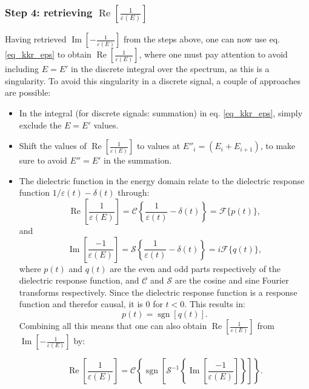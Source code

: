\subsubsection{Step 4: retrieving $\operatorname{Re}\left[\frac{1}{\varepsilon(E)}\right]$ }
Having retrieved $\operatorname{Im}\left[-\frac{1}{\varepsilon(E)}\right]$ from the steps above, one can now use eq. \eqref{eq_kkr_eps} to obtain $\operatorname{Re}\left[\frac{1}{\varepsilon(E)}\right]$, where one must pay attention to avoid including $E=E'$ in the discrete integral over the spectrum, as this is a singularity. To avoid this singularity in a discrete signal, a couple of approaches are possible:
\begin{itemize}
    \item In the integral (for discrete signals: summation) in eq. \eqref{eq_kkr_eps}, simply exclude the $E = E'$ values.
    \item Shift the values of $\operatorname{Re}\left[\frac{1}{\varepsilon(E)}\right]$ to values at $E''_i = (E_i + E_{i+1})$, to make sure to avoid $E'' = E'$ in the summation.
    \item  The dielectric function in the energy domain relate to the dielectric response function $1/\varepsilon(t) -\delta(t)$ through:
    \begin{equation}
        \operatorname{Re}\left[\frac{1}{\varepsilon(E)}\right] = \mathcal{C}\left\{\frac{1}{\varepsilon(t)} - \delta(t)\right\} = \mathcal{F}\{p(t)\},
    \end{equation}
    and 
    \begin{equation}
        \operatorname{Im}\left[\frac{-1}{\varepsilon(E)}\right] = \mathcal{S}\left\{\frac{1}{\varepsilon(t)} - \delta(t)\right\} = i\mathcal{F}\{q(t)\},
    \end{equation}
    where $p(t)$ and $q(t)$ are the even and odd parts respectively of the dielectric response function, and $\mathcal{C}$ and $\mathcal{S}$ are the cosine and sine Fourier transforms respectively. Since the dielectric response function is a response function and therefor causal, it is $0$ for $t<0$. This results in:
    \begin{equation}
        p(t) = \operatorname{sgn}[q(t)].
    \end{equation}
    Combining all this means that one can also obtain $\operatorname{Re}\left[\frac{1}{\varepsilon(E)}\right]$ from $\operatorname{Im}\left[-\frac{1}{\varepsilon(E)}\right]$ by:
    
    \begin{equation}
        \operatorname{Re}\left[\frac{1}{\varepsilon(E)}\right] =\mathcal{C}\left\{\operatorname{sgn}\left[\mathcal{S}^{-1}\left\{\operatorname{Im}\left[\frac{-1}{ \varepsilon(E)}\right]\right\}\right]\right\}.
    \end{equation}
\end{itemize}

